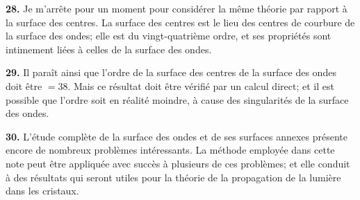 \documentclass[12pt,a4paper]{article}
\begin{document}
\textbf{28.} Je m'arr\^ete pour un moment pour consid\'erer la m\^eme th\'eorie par
rapport \`a la surface des centres. La surface des centres est le lieu des centres de
courbure de la surface des ondes; elle est du vingt-quatri\`eme ordre, et ses
propri\'et\'es sont intimement li\'ees \`a celles de la surface des ondes.

\textbf{29.} Il para\^it ainsi que l'ordre de la surface des centres de la surface des
ondes doit \^etre $= 38$. Mais ce r\'esultat doit \^etre v\'erifi\'e par un calcul direct; et il
est possible que l'ordre soit en r\'ealit\'e moindre, \`a cause des singularit\'es de la
surface des ondes.

\textbf{30.} L'\'etude compl\`ete de la surface des ondes et de ses surfaces annexes
pr\'esente encore de nombreux probl\`emes int\'eressants. La m\'ethode employ\'ee dans
cette note peut \^etre appliqu\'ee avec succ\`es \`a plusieurs de ces probl\`emes; et elle
conduit \`a des r\'esultats qui seront utiles pour la th\'eorie de la propagation de la
lumi\`ere dans les cristaux.
\end{document}
